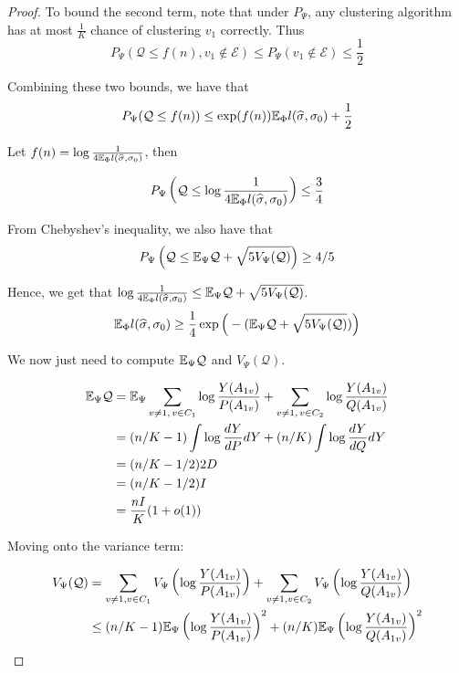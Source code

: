 \begin{proof}
To bound the second term, note that under $P_{\Psi}$, any clustering algorithm has at most $\frac{1}{K}$ chance of clustering $v_1$ correctly. Thus
\[
P_{\Psi}(\mathcal{Q} \leq f(n), v_1 \notin \mathcal{E}) \leq P_{\Psi}(v_1 \notin \mathcal{E}) \leq \frac{1}{2}
\]

Combining these two bounds, we have that
\[
P_{\Psi}(\mathcal{Q} \leq f(n)) \leq \exp(f(n)) {\mathbb E}_{\Phi} l(\widehat{\sigma}, \sigma_0) + \frac{1}{2}
\]

Let $f(n) = \log \frac{1}{4 {\mathbb E}_{\Phi} l(\widehat{\sigma}, \sigma_0)}$, then 

\[
P_{\Psi}\left(\mathcal{Q} \leq \log \frac{1}{4 {\mathbb E}_{\Phi} l(\widehat{\sigma}, \sigma_0)} \right) \leq \frac{3}{4}
\]

From Chebyshev's inequality, we also have that
\[
P_{\Psi}\left( \mathcal{Q} \leq {\mathbb E}_{\Psi} \mathcal{Q} + \sqrt{ 5 V_{\Psi}(\mathcal{Q})} \right) \geq 4/5
\]

Hence, we get that $\log \frac{1}{4 {\mathbb E}_{\Phi} l(\widehat{\sigma},\sigma_0)} \leq {\mathbb E}_{\Psi} \mathcal{Q} + \sqrt{ 5 V_{\Psi}(\mathcal{Q})}$.
\[
{\mathbb E}_{\Phi} l(\widehat{\sigma}, \sigma_0) \geq \frac{1}{4} \exp\Big( - ({\mathbb E}_{\Psi} \mathcal{Q} + \sqrt{ 5 V_{\Psi}(\mathcal{Q})} ) \Big)
\]

We now just need to compute ${\mathbb E}_{\Psi} \mathcal{Q}$ and $V_{\Psi}(\mathcal{Q})$.

\begin{align*}
{\mathbb E}_{\Psi} \mathcal{Q} &= {\mathbb E}_{\Psi}  \sum_{v \neq 1,\, v \in C_1} \log \frac{Y(A_{1v})}{P(A_{1v})} + \sum_{v \neq 1,\, v \in C_2} \log \frac{Y(A_{1v})}{Q(A_{1v})}  \\
     &= (n/K - 1) \int \log \frac{dY}{dP} dY + (n/K) \int \log \frac{dY}{dQ} dY \\
     &= (n/K - 1/2) 2 D\\
     &= (n/K - 1/2) I \\
     &= \frac{nI}{K} (1 + o(1)) 
\end{align*}

Moving onto the variance term:

\begin{align*}
V_{\Psi}(\mathcal{Q}) &= \sum_{v \neq 1, v\in C_1} V_{\Psi} \left( \log \frac{Y(A_{1v})}{P(A_{1v})} \right) +
                        \sum_{v \neq 1, v\in C_2} V_{\Psi} \left( \log \frac{Y(A_{1v})}{Q(A_{1v})} \right)  \\
   &\leq (n/K - 1) {\mathbb E}_{\Psi} \left( \log \frac{Y(A_{1v})}{P(A_{1v})} \right)^2 + 
        (n/K) {\mathbb E}_{\Psi} \left( \log \frac{Y(A_{1v})}{Q(A_{1v})} \right)^2 
\end{align*}


\end{proof}
